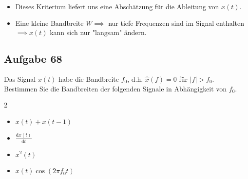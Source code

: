 \documentclass[11pt]{article}
\begin{document}
\begin{itemize}[leftmargin=0pt]
    \item[] Dieses Kriterium liefert uns eine Abschätzung für die Ableitung von $x(t)$.
    \item[] Eine kleine Bandbreite $W \implies$ nur tiefe Frequenzen sind im Signal enthalten $\implies x(t)$ kann sich nur "langsam" ändern.
\end{itemize}

\pagebreak

\subsection*{Aufgabe 68}
\vspace*{-0.5cm}
Das Signal $x(t)$ habe die Bandbreite $f_0$, d.h. $\hat{x}(f) = 0$ für $|f|>f_0$. Bestimmen Sie die Bandbreiten der folgenden Signale in Abhängigkeit von $f_0$.
\begin{multicols}{2}
    \begin{itemize}
        \item[a)] $x(t) + x(t-1)$
        \item[b)] $\displaystyle\frac{\text{d}x(t)}{\text{d}t}$
        \item[c)] $x^2(t)$
        \item[d)] $x(t)\cos(2 \pi f_0 t)$
    \end{itemize}
\end{multicols}

\end{document}
